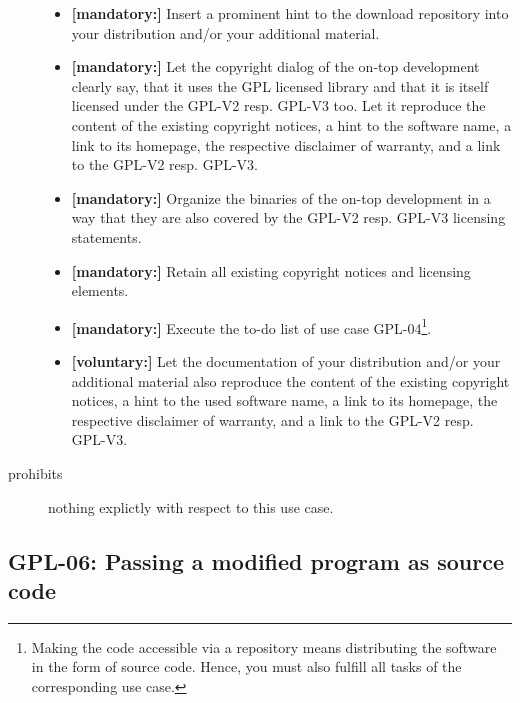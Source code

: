 \begin{description}
\begin{itemize}
  \item \textbf{[mandatory:]} Insert a prominent hint to the download repository
  into your distribution and/or your additional material.


  \item \textbf{[mandatory:]} Let the copyright dialog of the on-top development
  clearly say, that it uses the GPL licensed library and that it is itself
  licensed under the GPL-V2 resp. GPL-V3 too. Let it reproduce the content of
  the existing copyright notices, a hint to the software name, a link to its
  homepage, the respective disclaimer of warranty, and a link to the GPL-V2
  resp. GPL-V3.
  
  \item \textbf{[mandatory:]} Organize the binaries of the on-top development in
  a way that they are also covered by the GPL-V2 resp. GPL-V3 licensing
  statements.
  
  \item \textbf{[mandatory:]} Retain all existing copyright notices and
  licensing elements.
    
  \item \textbf{[mandatory:]} Execute the to-do list of use case GPL-04\footnote{
  Making the code accessible via a repository means distributing the software in
  the form of source code. Hence, you must also fulfill all tasks of the
  corresponding use case.}.

  \item \textbf{[voluntary:]} Let the documentation of your distribution and/or
  your additional material also reproduce the content of the existing
  copyright notices, a hint to the used software name, a link to its homepage,
  the respective disclaimer of warranty, and a link to the GPL-V2 resp.
  GPL-V3.

\end{itemize}

\item[prohibits] nothing explictly with respect to this use case.

\end{description}


\subsection{GPL-06: Passing a modified program as source code}
\label{OSUC-04S-GPL} 

